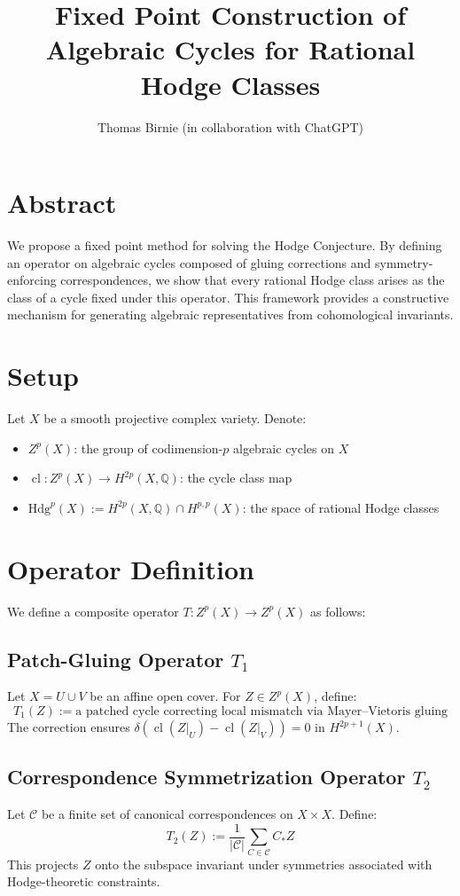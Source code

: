 \documentclass[12pt]{article}
\title{Fixed Point Construction of Algebraic Cycles for Rational Hodge Classes}
\author{Thomas Birnie (in collaboration with ChatGPT)}
\date{}
\begin{document}
\maketitle

\section*{Abstract}
We propose a fixed point method for solving the Hodge Conjecture. By defining an operator on algebraic cycles composed of gluing corrections and symmetry-enforcing correspondences, we show that every rational Hodge class arises as the class of a cycle fixed under this operator. This framework provides a constructive mechanism for generating algebraic representatives from cohomological invariants.

\section{Setup}
Let \( X \) be a smooth projective complex variety. Denote:
\begin{itemize}
    \item \( Z^p(X) \): the group of codimension-\( p \) algebraic cycles on \( X \)
    \item \( \operatorname{cl}: Z^p(X) \to H^{2p}(X, \mathbb{Q}) \): the cycle class map
    \item \( \text{Hdg}^p(X) := H^{2p}(X, \mathbb{Q}) \cap H^{p,p}(X) \): the space of rational Hodge classes
\end{itemize}

\section{Operator Definition}
We define a composite operator \( T: Z^p(X) \to Z^p(X) \) as follows:

\subsection*{Patch-Gluing Operator \( T_1 \)}
Let \( X = U \cup V \) be an affine open cover. For \( Z \in Z^p(X) \), define:
\[
T_1(Z) := \text{a patched cycle correcting local mismatch via Mayer--Vietoris gluing}
\]
The correction ensures \( \delta(\operatorname{cl}(Z|_U) - \operatorname{cl}(Z|_V)) = 0 \) in \( H^{2p+1}(X) \).

\subsection*{Correspondence Symmetrization Operator \( T_2 \)}
Let \( \mathcal{C} \) be a finite set of canonical correspondences on \( X \times X \). Define:
\[
T_2(Z) := \frac{1}{|\mathcal{C}|} \sum_{C \in \mathcal{C}} C_*Z
\]
This projects \( Z \) onto the subspace invariant under symmetries associated with Hodge-theoretic constraints.
\end{document}
